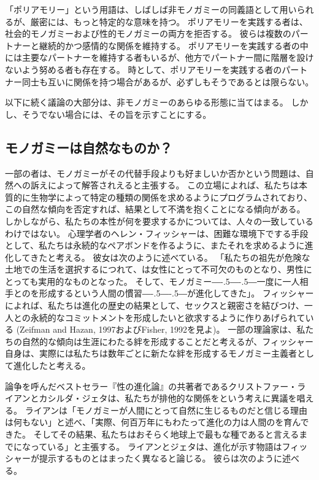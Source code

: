 \documentclass[paper=a4,book,openany]{jlreq}
\def\DDASH{―\kern-.5\zw―\kern-.5\zw―}
\begin{document}
「ポリアモリー」という用語は、しばしば非モノガミーの同義語として用いられるが、厳密には、もっと特定的な意味を持つ。
ポリアモリーを実践する者は、社会的モノガミーおよび性的モノガミーの両方を拒否する。
彼らは複数のパートナーと継続的かつ感情的な関係を維持する。
ポリアモリーを実践する者の中には主要なパートナーを維持する者もいるが、他方でパートナー間に階層を設けないよう努める者も存在する。
時として、ポリアモリーを実践する者のパートナー同士も互いに関係を持つ場合があるが、必ずしもそうであるとは限らない。

以下に続く議論の大部分は、非モノガミーのあらゆる形態に当てはまる。
しかし、そうでない場合には、その旨を示すことにする。

\subsection{モノガミーは自然なものか？}

一部の者は、モノガミーがその代替手段よりも好ましいか否かという問題は、自然への訴えによって解答されえると主張する。
この立場によれば、私たちは本質的に生物学によって特定の種類の関係を求めるようにプログラムされており、この自然な傾向を否定すれば、結果として不満を抱くことになる傾向がある。
しかしながら、私たちの本性が何を要求するかについては、人々の一致しているわけではない。
心理学者のヘレン・フィッシャーは、困難な環境下でする手段として、私たちは永続的なペアボンドを作るように、またそれを求めるように進化してきたと考える。
彼女は次のように述べている。
「私たちの祖先が危険な土地での生活を選択するにつれて、は女性にとって不可欠のものとなり、男性にとっても実用的なものとなった。
そして、モノガミー{\DDASH}一度に一人相手とのを形成するという人間の慣習{\DDASH}が進化してきた」\citep[p.131]{fisher04:_why_we_love}。
フィッシャーによれば、私たちは進化の歴史の結果として、セックスと親密さを結びつけ、一人との永続的なコミットメントを形成したいと欲求するように作りあげられている
(Zeifman and Hazan, 1997およびFisher, 1992を見よ)。
\nocite{zeifman97:_proces_model_adult_attac_format}\nocite{fisher92:_anatom_love}
一部の理論家は、私たちの自然的な傾向は生涯にわたる絆を形成することだと考えるが、フィッシャー自身は、実際には私たちは数年ごとに新たな絆を形成するモノガミー主義者として進化したと考える。

論争を呼んだベストセラー『性の進化論』\citep{ryan10:_sex_dawn}の共著者であるクリストファー・ライアンとカシルダ・ジェタは、私たちが排他的な関係をという考えに異議を唱える。
ライアンは「モノガミーが人間にとって自然に生じるものだと信じる理由は何もない」と述べ、「実際、何百万年にもわたって進化の力は人間のを育んできた。
そしてその結果、私たちはおそらく地球上で最もな種であると言えるまでになっている」と主張する\citep{ryan10:_monog_unnat_our_sexy_species}。
ライアンとジェタは、進化が示す物語はフィッシャーが提示するものとはまったく異なると論じる。
彼らは次のように述べる。
\end{document}
